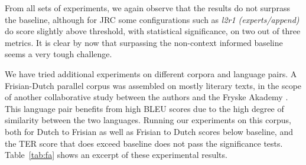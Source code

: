 From all sets of experiments, we again observe that the results do not surprass
the baseline, although for JRC some configurations such as \emph{l2r1
\footnotesize{(experts/append)}} do score slightly above threshold, with statistical
significance, on two out of three metrics. It is clear by now that surpassing the
non-context informed baseline seems a very tough challenge.

We have tried additional experiments on different corpora and language pairs. A
Frisian-Dutch parallel corpus was assembled on mostly literary texts, in the scope of another collaborative study between the authors and the Fryske Akademy
\citep{OERSETTER}. This language pair benefits from high BLEU scores due to the
high degree of similarity between the two languages. Running our experiments on
this corpus, both for Dutch to Frisian as well as Frisian to Dutch scores below
baseline, and the TER score that does exceed baseline does not pass the
significance tests.  Table~\ref{tab:fa} shows an excerpt of these experimental
results.

\begin{table}
\noindent{}
\caption{An excerpt of the results on the Frisian parallel corpus, Dutch to Frisian and Frisian to Dutch. For the latter, no METEOR scores are available} %
\label{tab:fa}
\end{table}

